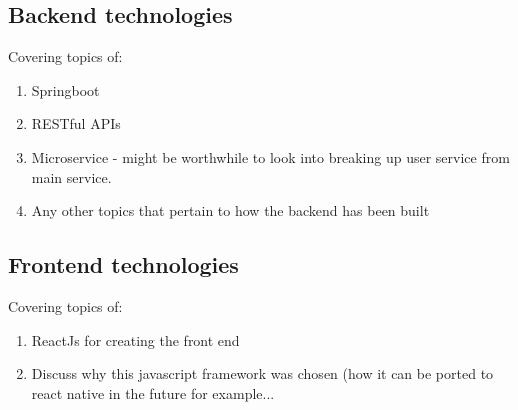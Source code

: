 \subsection{Backend technologies}
Covering topics of:
\begin{enumerate}
    \item Springboot
    \item RESTful APIs
    \item Microservice - might be worthwhile to look into breaking up user service from main service.
    \item Any other topics that pertain to how the backend has been built
\end{enumerate}


\subsection{Frontend technologies}
Covering topics of:
\begin{enumerate}
    \item ReactJs for creating the front end
    \item Discuss why this javascript framework was chosen (how it can be ported to react native in the future for example...
\end{enumerate}



